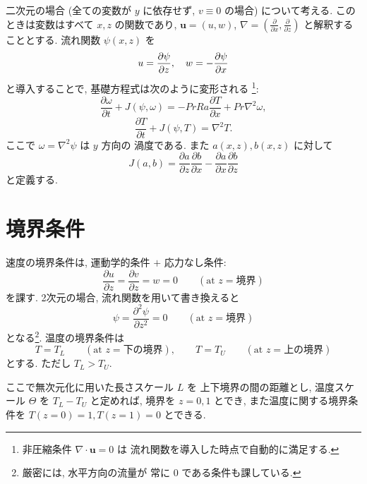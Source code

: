 \documentclass[12pt,a4j]{jsarticle}
\newcommand{\p}{\partial}
\begin{document}
  二次元の場合 (全ての変数が $y$ に依存せず, $v \equiv 0$ の場合)
について考える. このときは変数はすべて $x, z$ の関数であり,
$\bm{u} = (u, w)$, $\nabla = (\frac{\p}{\p x}, \frac{\p}{\p z})$
と解釈することとする. 流れ関数 $\psi(x, z)$ を
\begin{equation}
 u =   \dfrac{\p \psi}{\p z}, \quad
 w = - \dfrac{\p \psi}{\p x}
 \notag
\end{equation}
と導入することで, 基礎方程式は次のように変形される
\footnote{非圧縮条件 $\nabla \cdot \bm{u} = 0$ は
流れ関数を導入した時点で自動的に満足する.}:
\begin{equation}
 \dfrac{\p \omega}{\p t}
  + J(\psi, \omega)
  = - Pr Ra \dfrac{\p T}{\p x}
    + Pr \nabla^{2} \omega,
\end{equation}
\begin{equation}
 \dfrac{\p T}{\p t} + J(\psi, T) = \nabla^{2} T.
\end{equation}
ここで $\omega = \nabla^{2} \psi$ は $y$ 方向の
渦度である. また $a(x, z), b(x, z)$ に対して
\begin{equation}
 J(a, b) = 
  \dfrac{\p a}{\p z} \dfrac{\p b}{\p x}
  -
  \dfrac{\p a}{\p x} \dfrac{\p b}{\p z}
\end{equation}
と定義する.

\section{境界条件}

速度の境界条件は, 運動学的条件 $+$ 応力なし条件:
\begin{equation}
 \dfrac{\p u}{\p z}
  = \dfrac{\p v}{\p z}
  = w
  = 0
  \qquad (\text{at } z = \text{境界})
\end{equation}
を課す.
2次元の場合, 流れ関数を用いて書き換えると
\begin{equation}
 \psi = \dfrac{\p^{2} \psi}{\p z^{2}}
  = 0
  \qquad (\text{at } z = \text{境界})
\end{equation}
となる\footnote{厳密には, 水平方向の流量が
常に $0$ である条件も課している.}.
温度の境界条件は
\begin{equation}
 T = T_{L} \qquad (\text{at } z = \text{下の境界}),
  \qquad
 T = T_{U} \qquad (\text{at } z = \text{上の境界})
\end{equation}
とする. ただし $T_{L} > T_{U}$. \par

ここで無次元化に用いた長さスケール $L$ を
上下境界の間の距離とし, 温度スケール $\Theta$ を
$T_{L} - T_{U}$ と定めれば,
境界を $z = 0, 1$ とでき, また温度に関する境界条件を
$T(z = 0) = 1, T(z = 1) = 0$ とできる.
\end{document}
